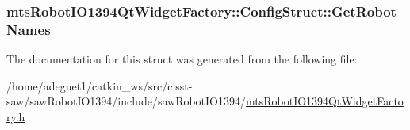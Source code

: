 \hypertarget{structmts_robot_i_o1394_qt_widget_factory_1_1_config_struct_a23dacd0bac2b78c3189369f05574f678}{
\subsubsection[{Get\-Robot\-Names}]{ mts\-Robot\-I\-O1394\-Qt\-Widget\-Factory\-::\-Config\-Struct\-::\-Get\-Robot\-Names}}\label{structmts_robot_i_o1394_qt_widget_factory_1_1_config_struct_a23dacd0bac2b78c3189369f05574f678}


The documentation for this struct was generated from the following file\-:\begin{DoxyCompactItemize}
\item 
/home/adeguet1/catkin\-\_\-ws/src/cisst-\/saw/saw\-Robot\-I\-O1394/include/saw\-Robot\-I\-O1394/\hyperlink{mts_robot_i_o1394_qt_widget_factory_8h}{mts\-Robot\-I\-O1394\-Qt\-Widget\-Factory.\-h}\end{DoxyCompactItemize}
